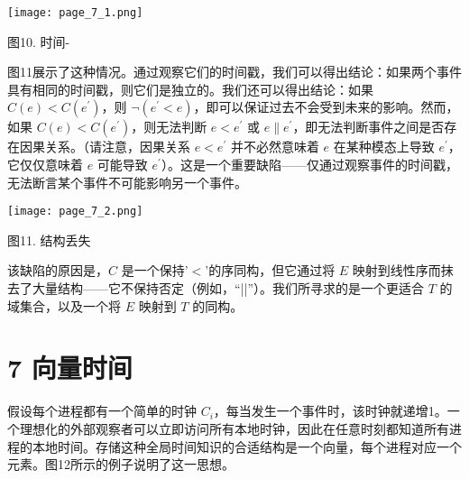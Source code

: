 \documentclass[12pt,a4paper]{report} %
\begin{document}
\begin{center}
\texttt{[image: page\_7\_1.png]}
\end{center}
\begin{center}
图10. 时间-
\end{center}

图11展示了这种情况。通过观察它们的时间戳，我们可以得出结论：如果两个事件具有相同的时间戳，则它们是独立的。我们还可以得出结论：如果 $C(e)<C\left(e^{\prime}\right)$，则 $\neg\left(e^{\prime}<e\right)$，即可以保证过去不会受到未来的影响。然而，如果 $C(e)<C\left(e^{\prime}\right)$，则无法判断 $e<e^{\prime}$ 或 $e \| e^{\prime}$，即无法判断事件之间是否存在因果关系。（请注意，因果关系 $e<e^{\prime}$ 并不必然意味着 $e$ 在某种模态上导致 $e^{\prime}$，它仅仅意味着 $e$ 可能导致 $e^{\prime}$）。这是一个重要缺陷——仅通过观察事件的时间戳，无法断言某个事件不可能影响另一个事件。

\begin{center}
\texttt{[image: page\_7\_2.png]}
\end{center}
\begin{center}
图11. 结构丢失
\end{center}

该缺陷的原因是，$C$ 是一个保持'$<$'的序同构，但它通过将 $E$ 映射到线性序而抹去了大量结构——它不保持否定（例如，“||”）。我们所寻求的是一个更适合 $T$ 的域集合，以及一个将 $E$ 映射到 $T$ 的同构。

\section*{7 向量时间}

假设每个进程都有一个简单的时钟 $C_{i}$，每当发生一个事件时，该时钟就递增1。一个理想化的外部观察者可以立即访问所有本地时钟，因此在任意时刻都知道所有进程的本地时间。存储这种全局时间知识的合适结构是一个向量，每个进程对应一个元素。图12所示的例子说明了这一思想。
\end{document}
